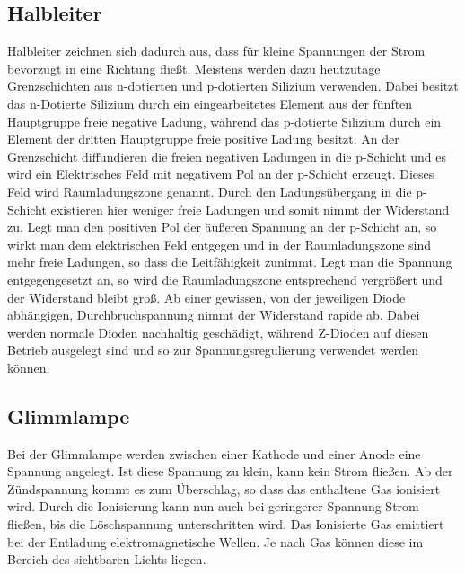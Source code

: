 \subsection{Halbleiter}
Halbleiter zeichnen sich dadurch aus, dass für kleine Spannungen der Strom bevorzugt in eine Richtung fließt. Meistens werden dazu heutzutage Grenzschichten aus n-dotierten und p-dotierten Silizium verwenden. Dabei besitzt das n-Dotierte Silizium durch ein eingearbeitetes Element aus der fünften Hauptgruppe freie negative Ladung, während das p-dotierte Silizium durch ein Element der dritten Hauptgruppe freie positive Ladung besitzt. An der Grenzschicht diffundieren die freien negativen Ladungen in die p-Schicht und es wird ein Elektrisches Feld mit negativem Pol an der p-Schicht erzeugt. Dieses Feld wird Raumladungszone genannt. Durch den Ladungsübergang in die p-Schicht existieren hier weniger freie Ladungen und somit nimmt der Widerstand zu. Legt man den positiven Pol der äußeren Spannung an der p-Schicht an, so wirkt man dem elektrischen Feld entgegen und in der Raumladungszone sind mehr freie Ladungen, so dass die Leitfähigkeit zunimmt. Legt man die Spannung entgegengesetzt an, so wird die Raumladungszone entsprechend vergrößert und der Widerstand bleibt groß. Ab einer gewissen, von der jeweiligen Diode abhängigen, Durchbruchspannung nimmt der Widerstand rapide ab. Dabei werden normale Dioden nachhaltig geschädigt, während Z-Dioden auf diesen Betrieb ausgelegt sind und so zur Spannungsregulierung verwendet werden können.

\subsection{Glimmlampe}
Bei der Glimmlampe werden zwischen einer Kathode und einer Anode eine Spannung angelegt. Ist diese Spannung zu klein, kann kein Strom fließen. Ab der Zündspannung kommt es zum Überschlag, so dass das enthaltene Gas ionisiert wird. Durch die Ionisierung kann nun auch bei geringerer Spannung Strom fließen, bis die Löschspannung unterschritten wird. Das Ionisierte Gas emittiert bei der Entladung elektromagnetische Wellen. Je nach Gas können diese im Bereich des sichtbaren Lichts liegen. 

